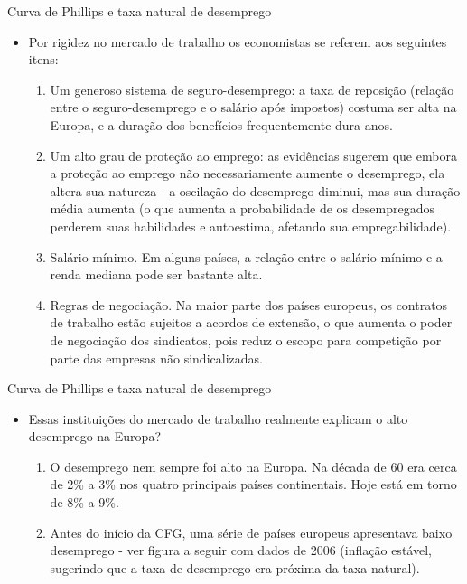 \documentclass[10pt]{beamer}
\begin{document}
\begin{frame}{Curva de Phillips e taxa natural de desemprego}
    \begin{itemize}
        \item Por rigidez no mercado de trabalho os economistas se referem aos seguintes itens:
        \bigskip
        \begin{enumerate}
            \item Um generoso sistema de seguro-desemprego: a taxa de reposição (relação entre o seguro-desemprego e o salário após impostos) costuma ser alta na Europa, e a duração dos benefícios frequentemente dura anos.
            \bigskip
            \item Um alto grau de proteção ao emprego: as evidências sugerem que embora a proteção ao emprego não necessariamente aumente o desemprego, ela altera sua natureza - a oscilação do desemprego diminui, mas sua duração média aumenta (o que aumenta a probabilidade de os desempregados perderem suas habilidades e autoestima, afetando sua empregabilidade).
            \bigskip
            \item Salário mínimo. Em alguns países, a relação entre o salário mínimo e a renda mediana pode ser bastante alta.
            \bigskip
            \item Regras de negociação. Na maior parte dos países europeus, os contratos de trabalho estão sujeitos a acordos de extensão, o que aumenta o poder de negociação dos sindicatos, pois reduz o escopo para competição por parte das empresas não sindicalizadas.
        \end{enumerate}
    \end{itemize}
\end{frame}

\begin{frame}{Curva de Phillips e taxa natural de desemprego}
    \begin{itemize}
        \item Essas instituições do mercado de trabalho realmente explicam o alto desemprego na Europa?
        \bigskip
        \begin{enumerate}
            \item O desemprego nem sempre foi alto na Europa. Na década de 60 era cerca de 2\% a 3\% nos quatro principais países continentais. Hoje está em torno de 8\% a 9\%.
            \bigskip
            \item Antes do início da CFG, uma série de países europeus apresentava baixo desemprego - ver figura a seguir com dados de 2006 (inflação estável, sugerindo que a taxa de desemprego era próxima da taxa natural).
        \end{enumerate}
    \end{itemize}
\end{frame}
\end{document}
